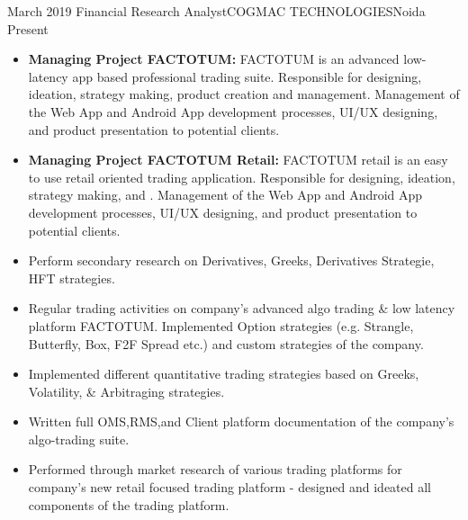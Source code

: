 %
%
%
\begin{experiences}
  \experience
    {March 2019}      {Financial Research Analyst}{COGMAC TECHNOLOGIES}{Noida}
    {Present} {
                      \begin{itemize}
                        \item \textbf{Managing Project FACTOTUM:} FACTOTUM is an advanced low-latency app based professional trading suite. Responsible for designing, ideation, strategy making, product creation and management. Management of the Web App and Android App development processes, UI/UX designing, and product presentation to potential clients.
                        
                        \item \textbf{Managing Project FACTOTUM Retail:} FACTOTUM retail is an easy to use retail oriented trading application. Responsible for designing, ideation, strategy making, and . Management of the Web App and Android App development processes, UI/UX designing, and product presentation to potential clients.
                        \item Perform secondary research on Derivatives, Greeks, Derivatives Strategie, HFT strategies.                   
                        \item Regular trading activities on company's advanced algo trading \& low latency platform FACTOTUM.
     Implemented Option strategies (e.g. Strangle, Butterfly, Box, F2F Spread etc.) and custom strategies of the company.                
                        \item Implemented different quantitative trading strategies based on Greeks, Volatility, \&   Arbitraging strategies. 
                        
                        \item Written full OMS,RMS,and Client platform documentation of the company's algo-trading suite.
                        
                        \item Performed through market research of various trading platforms for company's new retail focused trading platform - designed and ideated all components of the trading platform.
                        

\end{itemize}}
\end{experiences}
